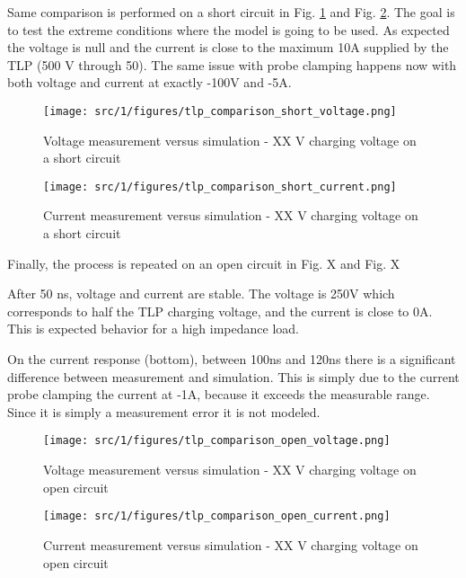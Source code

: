 Same comparison is performed on a short circuit in Fig. \ref{fig:comparison-tlp-short-v} and Fig. \ref{fig:comparison-tlp-short-i}.
The goal is to test the extreme conditions where the model is going to be used.
As expected the voltage is null and the current is close to the maximum 10A supplied by the TLP (500 V through 50\textOmega{}).
The same issue with probe clamping happens now with both voltage and current at exactly -100V and -5A.

\begin{figure}[!h]
  \centering
  \texttt{[image: src/1/figures/tlp\_comparison\_short\_voltage.png]}
  \caption{Voltage measurement versus simulation - XX V charging voltage on a short circuit}
  \label{fig:comparison-tlp-short-v}
\end{figure}

\begin{figure}[!h]
  \centering
  \texttt{[image: src/1/figures/tlp\_comparison\_short\_current.png]}
  \caption{Current measurement versus simulation - XX V charging voltage on a short circuit}
  \label{fig:comparison-tlp-short-i}
\end{figure}

Finally, the process is repeated on an open circuit in Fig. X and Fig. X

After 50 ns, voltage and current are stable.
The voltage is 250V which corresponds to half the TLP charging voltage, and the current is close to 0A.
This is expected behavior for a high impedance load.

On the current response (bottom), between 100ns and 120ns there is a significant difference between measurement and simulation.
This is simply due to the current probe clamping the current at -1A, because it exceeds the measurable range.
Since it is simply a measurement error it is not modeled.

\begin{figure}[!h]
  \centering
  \texttt{[image: src/1/figures/tlp\_comparison\_open\_voltage.png]}
  \caption{Voltage measurement versus simulation - XX V charging voltage on open circuit}
  \label{fig:comparison-tlp-1-v}
\end{figure}

\begin{figure}[!h]
  \centering
  \texttt{[image: src/1/figures/tlp\_comparison\_open\_current.png]}
  \caption{Current measurement versus simulation - XX V charging voltage on open circuit}
  \label{fig:comparison-tlp-1-i}
\end{figure}

